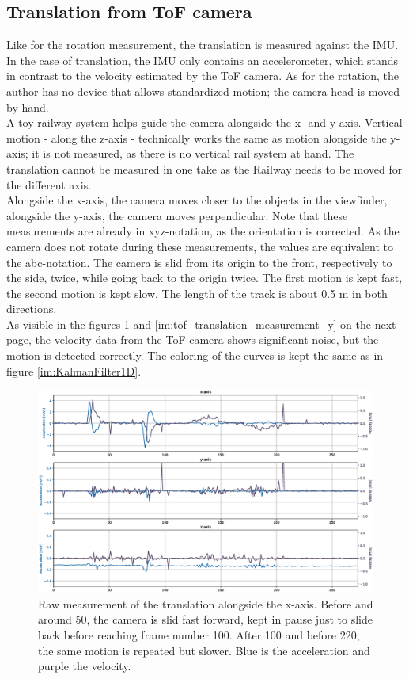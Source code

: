 \subsection{Translation from ToF camera}
Like for the rotation measurement, the translation is measured against the IMU. In the case of translation, the IMU only contains an accelerometer, which stands in contrast to the velocity estimated by the ToF camera. As for the rotation, the author has no device that allows standardized motion; the camera head is moved by hand.\\
A toy railway system helps guide the camera alongside the x- and y-axis. Vertical motion - along the z-axis - technically works the same as motion alongside the y-axis; it is not measured, as there is no vertical rail system at hand. The translation cannot be measured in one take as the Railway needs to be moved for the different axis.\\
Alongside the x-axis, the camera moves closer to the objects in the viewfinder, alongside the y-axis, the camera moves perpendicular. Note that these measurements are already in xyz-notation, as the orientation is corrected. As the camera does not rotate during these measurements, the values are equivalent to the abc-notation. The camera is slid from its origin to the front, respectively to the side, twice, while going back to the origin twice. The first motion is kept fast, the second motion is kept slow. The length of the track is about 0.5 m in both directions.\\
As visible in the figures \ref{im:tof_translation_measurement_x} and \ref{im:tof_translation_measurement_y} on the next page, the velocity data from the ToF camera shows significant noise, but the motion is detected correctly. The coloring of the curves is kept the same as in figure \ref{im:KalmanFilter1D}.
\begin{figure}[H]
  \centering
  \includegraphics[width=1.0\textwidth]{images/tof_translation_measurement_x.eps}
  \caption{Raw measurement of the translation alongside the x-axis. Before and around 50, the camera is slid fast forward, kept in pause just to slide back before reaching frame number 100. After 100 and before 220, the same motion is repeated but slower. Blue is the acceleration and purple the velocity.}
  \label{im:tof_translation_measurement_x}
\end{figure}
